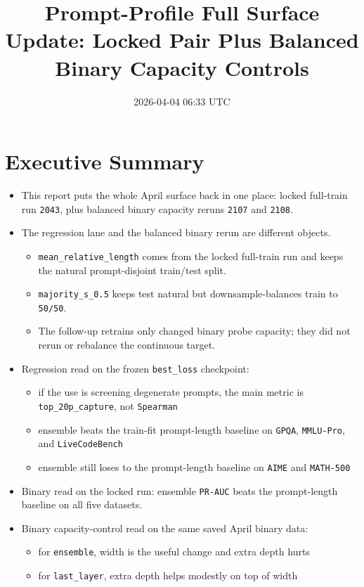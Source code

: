 \documentclass[11pt]{article}
\title{Prompt-Profile Full Surface Update: Locked Pair Plus Balanced Binary Capacity Controls}
\author{}
\date{2026-04-04 06:33 UTC}
\begin{document}
\maketitle

\section*{Executive Summary}
\begin{itemize}[leftmargin=1.5em]
\item This report puts the whole April surface back in one place: locked full-train run \texttt{2043}, plus balanced binary capacity reruns \texttt{2107} and \texttt{2108}.
\item The regression lane and the balanced binary rerun are different objects.
  \begin{itemize}[leftmargin=1.5em]
  \item \texttt{mean\_relative\_length} comes from the locked full-train run and keeps the natural prompt-disjoint train/test split.
  \item \texttt{majority\_s\_0.5} keeps test natural but downsample-balances train to \texttt{50/50}.
  \item The follow-up retrains only changed binary probe capacity; they did not rerun or rebalance the continuous target.
  \end{itemize}
\item Regression read on the frozen \texttt{best\_loss} checkpoint:
  \begin{itemize}[leftmargin=1.5em]
  \item if the use is screening degenerate prompts, the main metric is \texttt{top\_20p\_capture}, not \texttt{Spearman}
  \item ensemble beats the train-fit prompt-length baseline on \texttt{GPQA}, \texttt{MMLU-Pro}, and \texttt{LiveCodeBench}
  \item ensemble still loses to the prompt-length baseline on \texttt{AIME} and \texttt{MATH-500}
  \end{itemize}
\item Binary read on the locked run: ensemble \texttt{PR-AUC} beats the prompt-length baseline on all five datasets.
\item Binary capacity-control read on the same saved April binary data:
  \begin{itemize}[leftmargin=1.5em]
  \item for \texttt{ensemble}, width is the useful change and extra depth hurts
  \item for \texttt{last\_layer}, extra depth helps modestly on top of width

\end{itemize}
\end{itemize}
\end{document}
